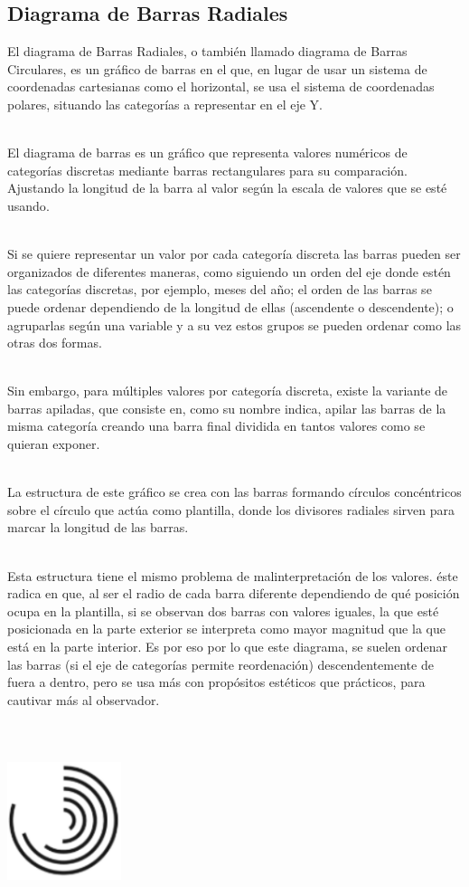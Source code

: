 \documentclass{article}\usepackage[]{graphicx}\usepackage[]{color}
\begin{document}
\subsection{Diagrama de Barras Radiales}\label{ssec:barras}
El diagrama de Barras Radiales, o tambi\'en llamado diagrama de Barras Circulares, es un gr\'afico de barras en el que, en lugar de usar un sistema de coordenadas cartesianas como el horizontal, se usa el sistema de coordenadas polares, situando las categor\'ias a representar en el eje Y.~\\~\par
El diagrama de barras es un gr\'afico que representa valores num\'ericos de categor\'ias discretas mediante barras rectangulares para su comparaci\'on. Ajustando la longitud de la barra al valor seg\'un la escala de valores que se est\'e usando\cite{historia-barras}.~\\~\par
Si se quiere representar un valor por cada categor\'ia discreta las barras pueden ser organizados de diferentes maneras, como siguiendo un orden del eje donde est\'en las categor\'ias discretas, por ejemplo, meses del a\~no; el orden de las barras se puede ordenar dependiendo de la longitud de ellas (ascendente o descendente); o agruparlas seg\'un una variable y a su vez estos grupos se pueden ordenar como las otras dos formas.~\\~\par
Sin embargo, para m\'ultiples valores por categor\'ia discreta, existe la variante de barras apiladas, que consiste en, como su nombre indica, apilar las barras de la misma categor\'ia creando una barra final dividida en tantos valores como se quieran exponer.~\\~\par
La estructura de este gr\'afico se crea con las barras formando c\'irculos conc\'entricos sobre el c\'irculo que act\'ua como plantilla, donde los divisores radiales sirven para marcar la longitud de las barras.~\\~\par
Esta estructura tiene el mismo problema de malinterpretaci\'on de los valores. \'este radica en que, al ser el radio de cada barra diferente dependiendo de qu\'e posici\'on ocupa en la plantilla, si se observan dos barras con valores iguales, la que est\'e posicionada en la parte exterior se interpreta como mayor magnitud que la que est\'a en la parte interior. Es por eso por lo que este diagrama, se suelen ordenar las barras (si el eje de categor\'ias permite reordenaci\'on) descendentemente de fuera a dentro, pero se usa m\'as con prop\'ositos est\'eticos que pr\'acticos, para cautivar m\'as al observador.
~\\~\\~\\~\\
\vbox{
    \centering
    \includegraphics[width=0.25\textwidth]{imag/barras_radiales}
}
\clearpage
\end{document}
